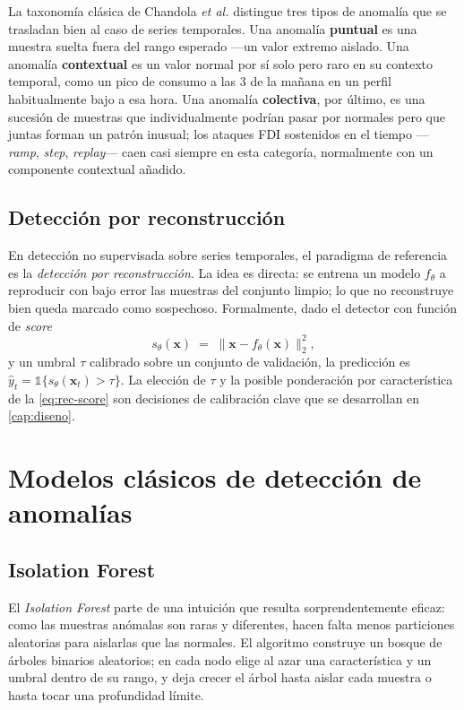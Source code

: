 La taxonomía clásica de Chandola \emph{et al.} \cite{chandola2009ad} distingue tres tipos de anomalía que se trasladan bien al caso de series temporales. Una anomalía \textbf{puntual} es una muestra suelta fuera del rango esperado ---un valor extremo aislado. Una anomalía \textbf{contextual} es un valor normal por sí solo pero raro en su contexto temporal, como un pico de consumo a las 3 de la mañana en un perfil habitualmente bajo a esa hora. Una anomalía \textbf{colectiva}, por último, es una sucesión de muestras que individualmente podrían pasar por normales pero que juntas forman un patrón inusual; los ataques FDI sostenidos en el tiempo ---\textit{ramp}, \textit{step}, \textit{replay}--- caen casi siempre en esta categoría, normalmente con un componente contextual añadido.

\subsection{Detección por reconstrucción}

En detección no supervisada sobre series temporales, el paradigma de referencia es la \emph{detección por reconstrucción}. La idea es directa: se entrena un modelo $f_\theta$ a reproducir con bajo error las muestras del conjunto limpio; lo que no reconstruye bien queda marcado como sospechoso. Formalmente, dado el detector con función de \emph{score}
\begin{equation}
s_\theta(\bm{x}) \;=\; \| \bm{x} - f_\theta(\bm{x}) \|_2^2,
\label{eq:rec-score}
\end{equation}
y un umbral $\tau$ calibrado sobre un conjunto de validación, la predicción es $\hat y_t = \mathbb{1}\{s_\theta(\bm{x}_t) > \tau\}$. La elección de $\tau$ y la posible ponderación por característica de la \cref{eq:rec-score} son decisiones de calibración clave que se desarrollan en \cref{cap:diseno}.

\section{Modelos clásicos de detección de anomalías}
\label{sec:teo-clasicos}

\subsection{Isolation Forest}

El \textit{Isolation Forest} \cite{liu2008isolation,liu2012iforest} parte de una intuición que resulta sorprendentemente eficaz: como las muestras anómalas son raras y diferentes, hacen falta menos particiones aleatorias para aislarlas que las normales. El algoritmo construye un bosque de árboles binarios aleatorios; en cada nodo elige al azar una característica y un umbral dentro de su rango, y deja crecer el árbol hasta aislar cada muestra o hasta tocar una profundidad límite.

